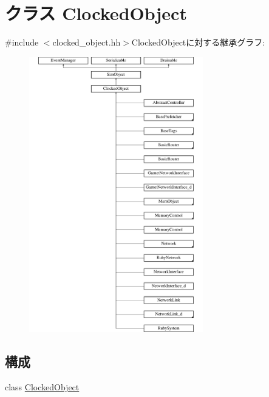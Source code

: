 \hypertarget{classClockedObject}{
\section{クラス ClockedObject}
\label{classClockedObject}
}


{\ttfamily \#include $<$clocked\_\-object.hh$>$}ClockedObjectに対する継承グラフ:\begin{figure}[H]
\begin{center}
\leavevmode
\includegraphics[height=12cm]{classClockedObject}
\end{center}
\end{figure}
\subsection*{構成}
\begin{DoxyCompactItemize}
\item 
class \hyperlink{classClockedObject_1_1ClockedObject}{ClockedObject}
\end{DoxyCompactItemize}
